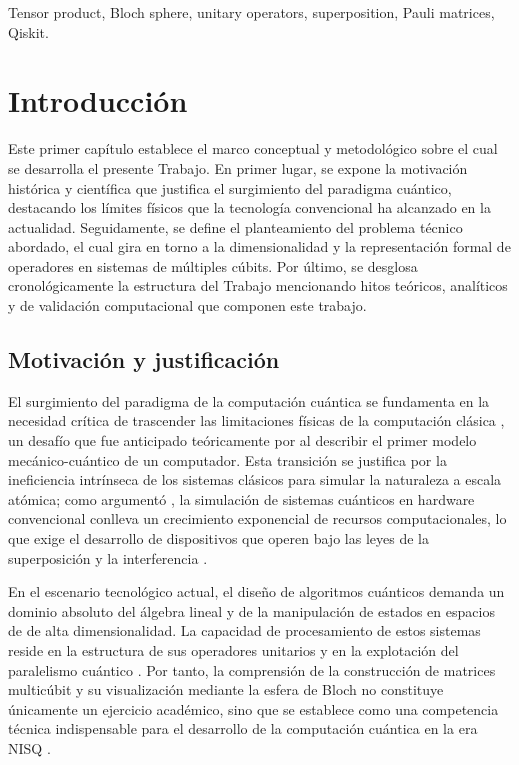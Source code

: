\documentclass[11pt,a4paper,spanish]{book}
\begin{document}
\vspace{0.5cm}
 Tensor product, Bloch sphere, unitary operators, superposition, Pauli matrices, Qiskit.
\mainmatter

\chapter{Introducción}

Este primer capítulo establece el marco conceptual y metodológico sobre el cual se desarrolla el presente Trabajo. En primer lugar, se expone la motivación histórica y científica que justifica el surgimiento del paradigma cuántico, destacando los límites físicos que la tecnología convencional ha alcanzado en la actualidad. Seguidamente, se define el planteamiento del problema técnico abordado, el cual gira en torno a la dimensionalidad y la representación formal de operadores en sistemas de múltiples cúbits. Por último, se desglosa cronológicamente la estructura del Trabajo mencionando hitos teóricos, analíticos y de validación computacional que componen este trabajo.

\section{Motivación y justificación}

El surgimiento del paradigma de la computación cuántica se fundamenta en la necesidad crítica de trascender las limitaciones físicas de la computación clásica \citep{landauer1961}, un desafío que fue anticipado teóricamente por \cite{benioff1980} al describir el primer modelo mecánico-cuántico de un computador. Esta transición se justifica por la ineficiencia intrínseca de los sistemas clásicos para simular la naturaleza a escala atómica; como argumentó \cite{feynman1982}, la simulación de sistemas cuánticos en hardware convencional conlleva un crecimiento exponencial de recursos computacionales, lo que exige el desarrollo de dispositivos que operen bajo las leyes de la superposición y la interferencia \citep{deutsch1985}.

En el escenario tecnológico actual, el diseño de algoritmos cuánticos demanda un dominio absoluto del álgebra lineal y de la manipulación de estados en espacios de \cite{hilbert1912} de alta dimensionalidad. La capacidad de procesamiento de estos sistemas reside en la estructura de sus operadores unitarios y en la explotación del paralelismo cuántico \citep{shor1994}. Por tanto, la comprensión de la construcción de matrices multicúbit y su visualización mediante la esfera de Bloch \citep{bloch1946} no constituye únicamente un ejercicio académico, sino que se establece como una competencia técnica indispensable para el desarrollo de la computación cuántica en la era NISQ \citep{preskill2018}.
\end{document}
